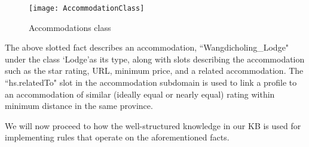 \begin{figure}
\begin{center}
\texttt{[image: AccommodationClass]}
\caption {Accommodations class}
\label{fig:Fig4.4}
\end{center}
\end{figure}

\hspace{0.3in}The above slotted fact describes an accommodation, ``Wangdicholing\_Lodge" under the class `Lodge'as its type, along with slots describing the accommodation such as the star rating, URL, minimum price, and a related accommodation. The ``hs.relatedTo" slot in the accommodation subdomain is used to link a profile to an accommodation of similar (ideally equal or nearly equal) rating within minimum distance in the same province.

\hspace{0.3in}We will now proceed to how the well-structured knowledge in our KB is used for implementing rules that operate on the aforementioned facts.







  
    
   


 
 




 

  

